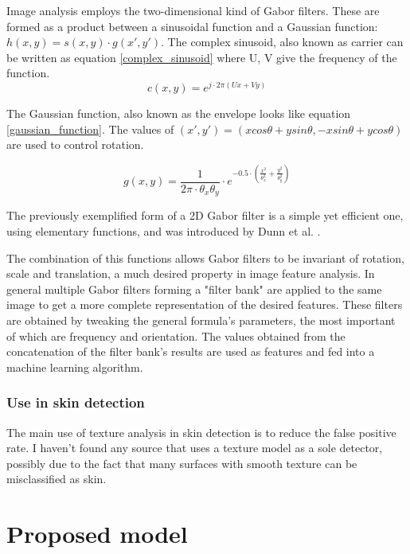\documentclass[12pt]{report}
\begin{document}
	Image analysis employs the two-dimensional kind of Gabor filters. These are formed as a product between a sinusoidal function and a Gaussian function: $h(x, y) = s(x, y) \cdot g(x', y') $. The complex sinusoid, also known as carrier can be written as equation \ref{complex_sinusoid} where U, V give the frequency of the function.
	\begin{equation} \label{complex_sinusoid}
	c(x, y) = e^{j \cdot 2\pi (Ux + Vy)}
	\end{equation}
	
	The Gaussian function, also known as the envelope looks like equation \ref{gaussian_function}. The values of $ (x', y') = (xcos\theta + ysin\theta, -xsin\theta + ycos\theta) $ are used to control rotation.
	
	\begin{equation} \label{gaussian_function}
	g(x, y) = \frac{1}{2\pi \cdot \theta_x \theta_y}\cdot e^{-0.5 \cdot (\frac{x^2}{\theta_x^2}+\frac{y^2}{\theta_y^2})} 
	\end{equation}
	
	The previously exemplified form of a 2D Gabor filter is a simple yet efficient one, using elementary functions, and was introduced by Dunn et al. \cite{gabor_filter_example}.
	
	The combination of this functions allows Gabor filters to be invariant of rotation, scale and translation, a much desired property in image feature analysis. In general multiple Gabor filters forming a "filter bank" are applied to the same image to get a more complete representation of the desired features. These filters are obtained by tweaking the general formula's parameters, the most important of which are frequency and orientation. The values obtained from the concatenation of the filter bank's results are used as features and fed into a machine learning algorithm\cite{gabor_filter_machine_learning}.
	
	\subsection{Use in skin detection}
	The main use of texture analysis in skin detection is to reduce the false positive rate. I haven’t found any source that uses a texture model as a sole detector, possibly due to the fact that many surfaces with smooth texture can be misclassified as skin.
	
	
	
	\chapter{Proposed model}
	
\end{document}
